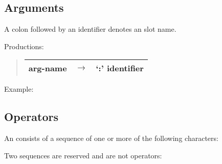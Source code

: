\documentclass[letterpaper,10pt,english]{sphinxmanual}
\begin{document}

\subsection{Arguments}
\label{\detokenize{langref:index-62}}\label{\detokenize{langref:arguments}}
A colon followed by an identifier denotes an  slot name.

Productions:
\begin{quote}

\noindent\begin{tabulary}{\linewidth}{|L|L|L|}
\hline

arg-name
&
\(\rightarrow\)
&
‘:’ identifier
\\
\hline\end{tabulary}

\end{quote}

Example:
\begin{quote}

\begin{DUlineblock}{0em}
\item[] 
\end{DUlineblock}
\end{quote}


\subsection{Operators}
\label{\detokenize{langref:operators}}\label{\detokenize{langref:index-63}}
An  consists of a sequence of one or more of the following characters:
\begin{quote}

\begin{DUlineblock}{0em}
\item[] 
\end{DUlineblock}
\end{quote}

Two sequences are reserved and are not operators:
\begin{quote}

\begin{DUlineblock}{0em}
\item[] \sphinxcode{\textbar{} \textasciicircum{}}
\end{DUlineblock}
\end{quote}
\end{document}
